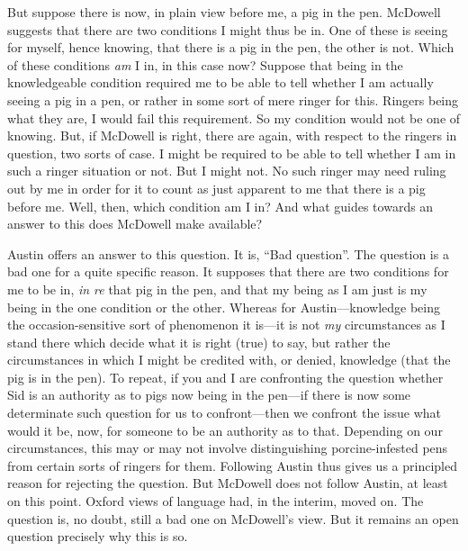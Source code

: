 But suppose there is now, in plain view before me, a pig in the pen. McDowell suggests that there are two conditions I might thus be in. One of these is seeing for myself, hence knowing, that there is a pig in the pen, the other is not. Which of these conditions \emph{am} I in, in this case now? Suppose that being in the knowledgeable condition required me to be able to tell whether I am actually seeing a pig in a pen, or rather in some sort of mere ringer for this. Ringers being what they are, I would fail this requirement. So my condition would not be one of knowing. But, if McDowell is right, there are again, with respect to the ringers in question, two sorts of case. I might be required to be able to tell whether I am in such a ringer situation or not. But I might not. No such ringer may need ruling out by me in order for it to count as just apparent to me that there is a pig before me. Well, then, which condition am I in? And what guides towards an answer to this does McDowell make available?

Austin offers an answer to this question. It is, ``Bad question''. The question is a bad one for a quite specific reason. It supposes that there are two conditions for me to be in, \emph{in re} that pig in the pen, and that my being as I am just is my being in the one condition or the other. Whereas for Austin---knowledge being the occasion-sensitive sort of phenomenon it is---it is not \emph{my} circumstances as I stand there which decide what it is right (true) to say, but rather the circumstances in which I might be credited with, or denied, knowledge (that the pig is in the pen). To repeat, if you and I are confronting the question whether Sid is an authority as to pigs now being in the pen---if there is now some determinate such question for us to confront---then we confront the issue what would it be, now, for someone to be an authority as to that. Depending on our circumstances, this may or may not involve distinguishing porcine-infested pens from certain sorts of ringers for them. Following Austin thus gives us a principled reason for rejecting the question. But McDowell does not follow Austin, at least on this point. Oxford views of language had, in the interim, moved on. The question is, no doubt, still a bad one on McDowell’s view. But it remains an open question precisely why this is so.

